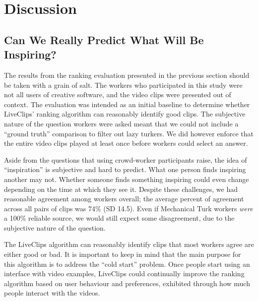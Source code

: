 \section{Discussion}

\subsection{Can We Really Predict What Will Be Inspiring?}
The results from the ranking evaluation presented in the previous section should be taken with a grain of salt. The workers who participated in this study were not all users of creative software, and the video clips were presented out of context. The evaluation was intended as an initial baseline to determine whether LiveClips' ranking algorithm can reasonably identify good clips. The subjective nature of the question workers were asked meant that we could not include a ``ground truth'' comparison to filter out lazy turkers. We did however enforce that the entire video clips played at least once before workers could select an answer.

Aside from the questions that using crowd-worker participants raise, the idea of ``inspiration'' is subjective and hard to predict. What one person finds inspiring another may not. Whether someone finds something inspiring could even change depending on the time at which they see it. Despite these challenges, we had reasonable agreement among workers overall; the average percent of agreement across all pairs of clips was 74\% (SD 14.5). Even if Mechanical Turk workers \textit{were} a 100\% reliable source, we would still expect some disagreement, due to the subjective nature of the question.

The LiveClips algorithm can reasonably identify clips that most workers agree are either good or bad. It is important to keep in mind that the main purpose for this algorithm is to address the ``cold start'' problem. Once people start using an interface with video examples, LiveClips could continually improve the ranking algorithm based on user behaviour and preferences, exhibited through how much people interact with the videos. %

